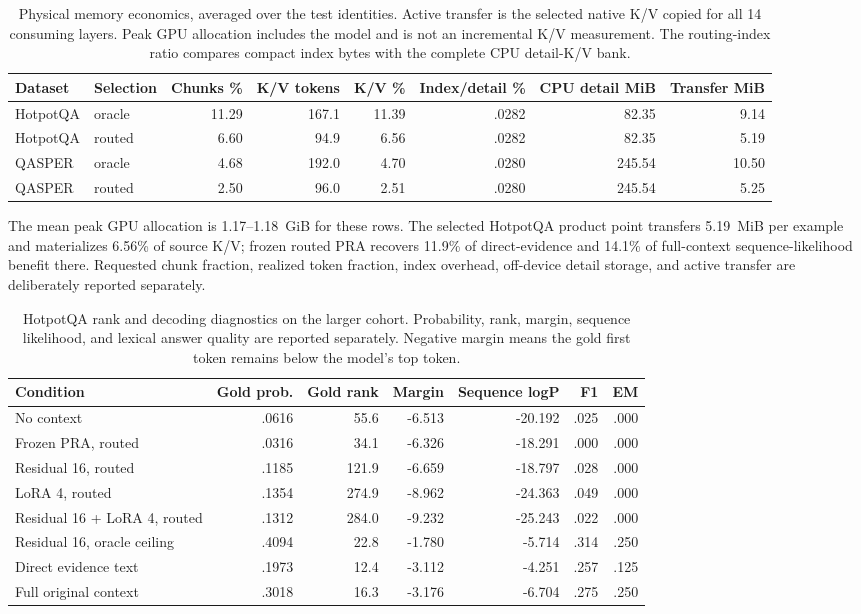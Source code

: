 \documentclass[11pt]{article}
\begin{document}
\begin{table}[H]
\centering
\scriptsize
\caption{Physical memory economics, averaged over the test identities. Active transfer is the
selected native K/V copied for all 14 consuming layers. Peak GPU allocation includes the model
and is not an incremental K/V measurement. The routing-index ratio compares compact index bytes
with the complete CPU detail-K/V bank.}
\label{tab:last14-economics}
\begin{tabular}{llrrrrrr}
\toprule
Dataset & Selection & Chunks \% & K/V tokens & K/V \% & Index/detail \% & CPU detail MiB & Transfer MiB \\
\midrule
HotpotQA & oracle & 11.29 & 167.1 & 11.39 & .0282 & 82.35 & 9.14 \\
HotpotQA & routed & 6.60 & 94.9 & 6.56 & .0282 & 82.35 & 5.19 \\
QASPER & oracle & 4.68 & 192.0 & 4.70 & .0280 & 245.54 & 10.50 \\
QASPER & routed & 2.50 & 96.0 & 2.51 & .0280 & 245.54 & 5.25 \\
\bottomrule
\end{tabular}
\end{table}

The mean peak GPU allocation is 1.17--1.18~GiB for these rows. The selected HotpotQA product
point transfers 5.19~MiB per example and materializes 6.56\% of source K/V; frozen routed PRA
recovers 11.9\% of direct-evidence and 14.1\% of full-context sequence-likelihood benefit there.
Requested chunk fraction, realized token fraction, index overhead, off-device detail storage,
and active transfer are deliberately reported separately.

\begin{table}[H]
\centering
\scriptsize
\caption{HotpotQA rank and decoding diagnostics on the larger cohort. Probability, rank, margin,
sequence likelihood, and lexical answer quality are reported separately. Negative margin means
the gold first token remains below the model's top token.}
\label{tab:last14-rank}
\begin{tabular}{lrrrrrr}
\toprule
Condition & Gold prob. & Gold rank & Margin & Sequence logP & F1 & EM \\
\midrule
No context & .0616 & 55.6 & -6.513 & -20.192 & .025 & .000 \\
Frozen PRA, routed & .0316 & 34.1 & -6.326 & -18.291 & .000 & .000 \\
Residual 16, routed & .1185 & 121.9 & -6.659 & -18.797 & .028 & .000 \\
LoRA 4, routed & .1354 & 274.9 & -8.962 & -24.363 & .049 & .000 \\
Residual 16 + LoRA 4, routed & .1312 & 284.0 & -9.232 & -25.243 & .022 & .000 \\
Residual 16, oracle ceiling & .4094 & 22.8 & -1.780 & -5.714 & .314 & .250 \\
Direct evidence text & .1973 & 12.4 & -3.112 & -4.251 & .257 & .125 \\
Full original context & .3018 & 16.3 & -3.176 & -6.704 & .275 & .250 \\
\bottomrule
\end{tabular}
\end{table}
\end{document}
